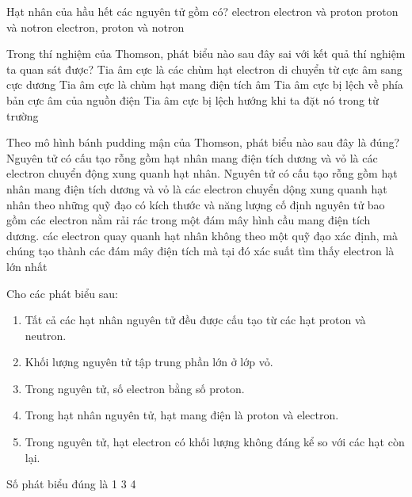 \begin{ex}[1]
	Hạt nhân của hầu hết các nguyên tử gồm có?
	\choice
	{%
		electron
	}
	{%
		electron và proton
	}
	{%
	\True proton và notron
	}
	{%
		 electron, proton và notron
	}
\huongdan{
	
}
\end{ex}

\begin{ex}[2]
Trong thí nghiệm của Thomson, phát biểu nào sau đây sai với kết quả thí nghiệm ta quan sát được?
	\choice
{%
 Tia âm cực là các chùm hạt electron di chuyển từ cực âm sang cực dương
}
{%
	Tia âm cực là chùm hạt mang điện tích âm
}
{%
\True	Tia âm cực bị lệch về phía bản cực âm của nguồn điện
}
{%
	Tia âm cực bị lệch hướng khi ta đặt nó trong từ trường
}
\huongdan{
	
}
\end{ex}

\begin{ex}[2]
Theo mô hình bánh pudding mận của Thomson, phát biểu nào sau đây là đúng?
\choice
{%
Nguyên tử có cấu tạo rỗng gồm hạt nhân mang điện tích dương và vỏ là các electron chuyển động xung quanh hạt nhân.
}
{%
Nguyên tử có cấu tạo rỗng gồm hạt nhân mang điện tích dương và vỏ là các electron chuyển dộng xung quanh hạt nhân theo những quỹ đạo có kích thước và năng lượng cố định
}
{%
\True	nguyên tử bao gồm các electron nằm rải rác trong một đám mây hình cầu mang điện tích dương.
}
{%
	các electron  quay quanh hạt nhân không theo một quỹ đạo xác định, mà chúng tạo thành các đám mây điện tích mà tại đó xác suất tìm thấy electron là lớn nhất
}
\huongdan{
	
}
\end{ex}
\begin{ex}[2]
Cho các phát biểu sau:
\begin{enumerate}[(1)]
\item Tất cả các hạt nhân nguyên tử đều được cấu tạo từ các hạt proton và neutron.
\item Khối lượng nguyên tử tập trung phần lớn ở lớp vỏ.
\item Trong nguyên tử, số electron bằng số proton.
\item Trong hạt nhân nguyên tử, hạt mang điện là proton và electron.
\item Trong nguyên tử, hạt electron có khối lượng không đáng kể so với các hạt còn lại.
\end{enumerate}
Số phát biểu đúng là
\choice
{%
	1
}
{%
}
{%
3
}
{%
4
}

\end{ex}

